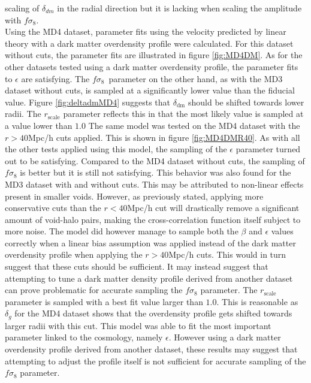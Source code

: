 scaling of $\delta_{dm}$ in the radial direction but it is lacking when scaling the amplitude with $f\sigma_8$.\\\indent
Using the MD4 dataset, parameter fits using the velocity predicted by linear theory with a dark matter overdensity profile were calculated. For this dataset without cuts, the parameter fits are illustrated in figure \ref{fig:MD4DM}. As for the other datasets tested using a dark matter overdensity profile, the parameter fits to $\epsilon$ are satisfying. The $f\sigma_8$ parameter on the other hand, as with the MD3 dataset without cuts, is sampled at a significantly lower value than the fiducial value. Figure \ref{fig:deltadmMD4} suggests that $\delta_{\mathrm{dm}}$ should be shifted towards lower radii. The $r_{\mathrm{scale}}$ parameter reflects this in that the most likely value is sampled at a value lower than $1.0$ The same model was tested on the MD4 dataset with the $r>40$Mpc/h cuts applied. This is shown in figure \ref{fig:MD4DMR40}. As with all the other tests applied using this model, the sampling of the $\epsilon$ parameter turned out to be satisfying. Compared to the MD4 dataset without cuts, the sampling of $f\sigma_8$ is better but it is still not satisfying. This behavior was also found for the MD3 dataset with and without cuts. This may be attributed to non-linear effects present in smaller voids. However, as previously stated, applying more conservative cuts than the $r<40$Mpc/h cut will drastically remove a significant amount of void-halo pairs, making the cross-correlation function itself subject to more noise. The model did however manage to sample both the $\beta$ and $\epsilon$ values correctly when a linear bias assumption was applied instead of the dark matter overdensity profile when applying the $r>40$Mpc/h cuts. This would in turn suggest that these cuts should be sufficient. It may instead suggest that attempting to tune a dark matter density profile derived from another dataset can prove problematic for accurate sampling the $f\sigma_8$ parameter. The $r_\mathrm{scale}$ parameter is sampled with a best fit value larger than $1.0$. This is reasonable as $\delta_g$ for the MD4 dataset shows that the overdensity profile gets shifted towards larger radii with this cut. This model was able to fit the most important parameter linked to the cosmology, namely $\epsilon$. However using a dark matter overdensity profile derived from another dataset, these results may suggest that attempting to adjust the profile itself is not sufficient for accurate sampling of the $f\sigma_8$ parameter.

